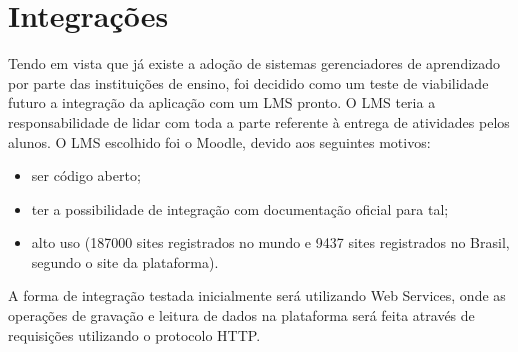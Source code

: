 \chapter{Integrações}
Tendo em vista que já existe a adoção de sistemas gerenciadores de aprendizado por parte das instituições de ensino, foi decidido como um teste de viabilidade futuro a integração da aplicação com um LMS pronto. O LMS teria a responsabilidade de lidar com toda a parte referente à entrega de atividades pelos alunos. O LMS escolhido foi o Moodle, devido aos seguintes motivos:
\begin{itemize}
    \item{ser código aberto;}
    \item{ter a possibilidade de integração com documentação oficial para tal;} 
    \item{alto uso (187000 sites registrados no mundo e 9437 sites registrados no Brasil, segundo o site da plataforma).}
\end{itemize}

A forma de integração testada inicialmente será utilizando Web Services, onde as operações de gravação e leitura de dados na plataforma será feita através de requisições utilizando o protocolo HTTP.